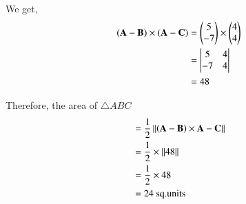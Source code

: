 \documentclass[journal,11pt]{IEEEtran}
\begin{document}
We get,
\begin{align}
    (\mathbf{A} - \mathbf{B})\times(\mathbf{A} - \mathbf{C}) &= \begin{pmatrix}5 \\ -7\end{pmatrix} \times \begin{pmatrix}4 \\ 4\end{pmatrix}\\
                                                 &= \begin{vmatrix}5 & 4 \\-7 & 4\end{vmatrix}\\
                                                 &=  48 
\end{align}

Therefore, the area of $\triangle ABC$
\begin{align}
     & = \frac{1}{2}\left\lVert{\ensuremath{\left(\mathbf{A}-\mathbf{B}\right)}\times {\mathbf{A}-\mathbf{C}}}\right\rVert \\
     & = \frac{1}{2}\times\left\lVert{48}\right\rVert\\
     & = \frac{1}{2}\times{48}\\
     & = 24\ \text{sq.units}
\end{align}
\end{document}
